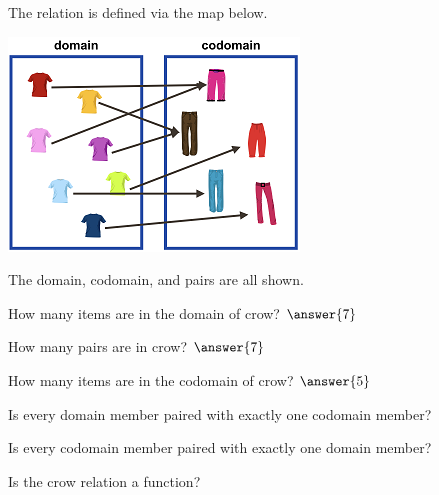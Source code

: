 \documentclass{ximera}
\begin{document}
  
  \begin{definition}
The relation  is defined via the map below.

  \includegraphics[width=292px,height=215px]{pics/r15.png}
  
  The domain, codomain, and pairs are all shown.


  
  \end{definition}
  


\begin{exercise}
How many items are in the domain of crow? $\answer{7}$
\end{exercise}


\begin{exercise}
How many pairs are in crow? $\answer{7}$
\end{exercise}

\begin{exercise}
How many items are in the codomain of crow? $\answer{5}$
\end{exercise}




\begin{exercise}
Is every domain member paired with exactly one codomain member?

  \begin{multipleChoice}
  \end{multipleChoice}
\end{exercise}


\begin{exercise}
Is every codomain member paired with exactly one domain member?

  \begin{multipleChoice}
  \end{multipleChoice}
\end{exercise}



\begin{exercise}
Is the crow relation a function?

  \begin{multipleChoice}
  \end{multipleChoice}
\end{exercise}
\end{document}
